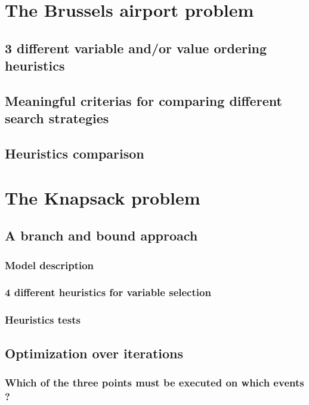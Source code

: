 \documentclass{eplDoc}
\begin{document}
\maketitle
\newpage

\section{The Brussels airport problem} %
\subsection{3 different variable and/or value ordering heuristics}

\subsection{Meaningful criterias for comparing different search strategies}

\subsection{Heuristics comparison} %

\section{The Knapsack problem}
\subsection{A branch and bound approach} %

\subsubsection{Model description}
\subsubsection{4 different heuristics for variable selection}
\subsubsection{Heuristics tests} %

\subsection{Optimization over iterations} %
\subsubsection{Which of the three points must be executed on which events ?}
\end{document}
